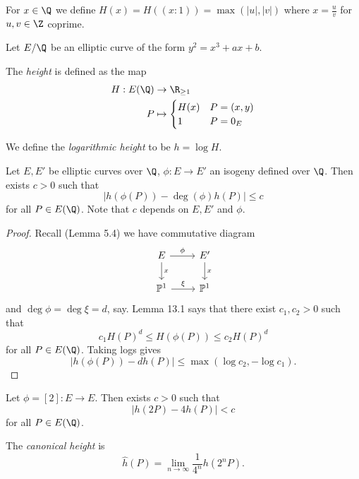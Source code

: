 \documentclass[a4paper]{article}
\theoremstyle{definition}
\theoremstyle{theorem}
\renewcommand*{\P}{\mathbb{P}}
\begin{document}
\begin{notation}
  For \(x \in \Q\) we define \(H(x) = H((x: 1)) = \max(|u|, |v|)\) where \(x = \frac{u}{v}\) for \(u, v \in \Z\) coprime.
\end{notation}

Let \(E/\Q\) be an elliptic curve of the form \(y^2 = x^3 + ax + b\).

\begin{definition}[height]
  The \emph{height} is defined as the map
  \begin{align*}
    H: E(\Q) &\to \R_{\geq 1} \\
    P &\mapsto
        \begin{cases}
          H(x) & P = (x, y) \\
          1 & P = 0_E
        \end{cases}
  \end{align*}

  We define the \emph{logarithmic height} to be \(h = \log H\).
\end{definition}

\begin{lemma}
  Let \(E, E'\) be elliptic curves over \(\Q\), \(\phi: E \to E'\) an isogeny defined over \(\Q\). Then exists \(c > 0\) such that
  \[
    |h(\phi(P)) - \deg(\phi) h(P)| \leq c
  \]
  for all \(P \in E(\Q)\). Note that \(c\) depends on \(E, E'\) and \(\phi\).
\end{lemma}

\begin{proof}
  Recall (Lemma 5.4) we have commutative diagram
  \[
    \begin{tikzcd}
      E \ar[r, "\phi"] \ar[d, "x"] & E' \ar[d, "x"] \\
      \P^1 \ar[r, "\xi"] & \P^1
    \end{tikzcd}
  \]
  and \(\deg \phi = \deg \xi = d\), say. Lemma 13.1 says that there exist \(c_1, c_2 > 0\) such that
  \[
    c_1 H(P)^d \leq H(\phi(P)) \leq c_2 H(P)^d
  \]
  for all \(P \in E(\Q)\). Taking logs gives
  \[
    |h(\phi(P)) - d h(P)| \leq \max(\log c_2, -\log c_1).
  \]
\end{proof}

\begin{eg}
  Let \(\phi = [2]: E \to E\). Then exists \(c > 0\) such that
  \[
    |h(2P) - 4h(P)| < c
  \]
  for all \(P \in E(\Q)\).
\end{eg}

\begin{definition}
  The \emph{canonical height} is
  \[
    \hat h(P) = \lim_{n \to \infty} \frac{1}{4^n} h(2^nP).
  \]
\end{definition}
\end{document}

